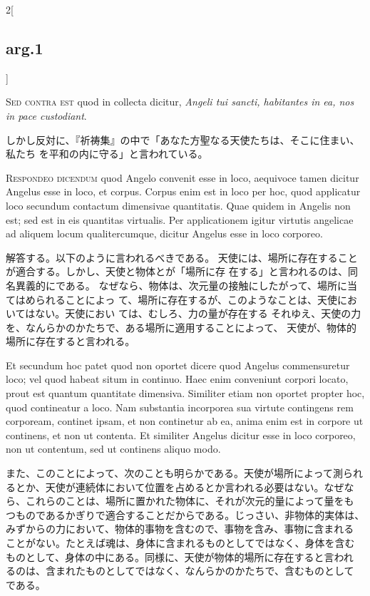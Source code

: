 \documentclass[paper=a4paper,fontsize=10pt,jafontsize=9pt,titlepage]{jlreq}
\begin{document}
\begin{paracol}{2}[\subsection{arg.1}]
\switchcolumn*[\subsection{s.c.}]

{\scshape Sed contra est} quod in collecta dicitur, {\itshape Angeli tui sancti,
 habitantes in ea, nos in pace custodiant}.

\switchcolumn

しかし反対に、『祈祷集』の中で「あなた方聖なる天使たちは、そこに住まい、私たち
 を平和の内に守る」と言われている。


{\scshape Respondeo dicendum} quod Angelo convenit esse in loco,
 aequivoce tamen dicitur Angelus esse in loco, et corpus. Corpus enim
 est in loco per hoc, quod applicatur loco secundum contactum dimensivae
 quantitatis. Quae quidem in Angelis non est; sed est in eis quantitas
 virtualis. Per applicationem igitur virtutis angelicae ad aliquem locum
 qualitercumque, dicitur Angelus esse in loco corporeo.

\switchcolumn

解答する。以下のように言われるべきである。
天使には、場所に存在することが適合する。しかし、天使と物体とが「場所に存
 在する」と言われるのは、同名異義的にである。
なぜなら、物体は、次元量の接触にしたがって、場所に当てはめられることによっ
 て、場所に存在するが、このようなことは、天使においてはない。天使におい
 ては、むしろ、力の量が存在する
それゆえ、天使の力を、なんらかのかたちで、ある場所に適用することによって、
 天使が、物体的場所に存在すると言われる。

\switchcolumn*

Et secundum hoc
 patet quod non oportet dicere quod Angelus commensuretur loco; vel quod
 habeat situm in continuo. Haec enim conveniunt corpori locato, prout
 est quantum quantitate dimensiva. Similiter etiam non oportet propter
 hoc, quod contineatur a loco. Nam substantia incorporea sua virtute
 contingens rem corpoream, continet ipsam, et non continetur ab ea,
 anima enim est in corpore ut continens, et non ut contenta. Et
 similiter Angelus dicitur esse in loco corporeo, non ut contentum, sed
 ut continens aliquo modo.

\switchcolumn

また、このことによって、次のことも明らかである。天使が場所によって測られ
 るとか、天使が連続体において位置を占めるとか言われる必要はない。なぜな
 ら、これらのことは、場所に置かれた物体に、それが次元的量によって量をも
 つものであるかぎりで適合することだからである。じっさい、非物体的実体は、
 みずからの力において、物体的事物を含むので、事物を含み、事物に含まれる
 ことがない。たとえば魂は、身体に含まれるものとしてではなく、身体を含む
 ものとして、身体の中にある。同様に、天使が物体的場所に存在すると言われ
 るのは、含まれたものとしてではなく、なんらかのかたちで、含むものとして
 である。


\end{paracol}
\end{document}
